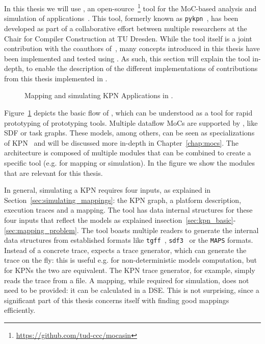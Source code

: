 In this thesis we will use \mocasin, an open-source~\footnote{\url{https://github.com/tud-ccc/mocasin}} tool for the \ac{MoC}-based analysis and simulation of applications~\cite{menard_rapido21}.
This tool, formerly known as \texttt{pykpn}~\cite{menard_norcas16,goens_mcsoc18}, has been developed as part of a collaborative effort between multiple researchers at the Chair for Compiler Construction at TU Dresden.
While the tool itself is a joint contribution with the coauthors of~\cite{menard_rapido21}, many concepts introduced in this thesis have been implemented and tested using \mocasin.
As such, this section will explain the tool in-depth, to enable the description of the different implementations of contributions from this thesis implemented in \mocasin.

\begin{figure}[h]
	\centering
   \resizebox{0.95\textwidth}{!}{}
	\caption{Mapping and simulating KPN Applications in \mocasin.}
	\label{fig:mocasin_arch}
\end{figure}


Figure~\ref{fig:mocasin_arch} depicts the basic flow of \mocasin,
which can be understood as a tool for rapid prototyping of prototyping tools.
Multiple dataflow \acp{MoC} are supported by \mocasin, like \ac{SDF} or task graphs.
These models, among others, can be seen as specializations of \ac{KPN}~\cite{lee1995dataflow} and will be discussed more in-depth in Chapter~\ref{chap:mocs}.
The \mocasin architecture is composed of multiple modules that can be combined to create a specific tool (e.g. for mapping or simulation). 
In the figure we show the modules that are relevant for this thesis.

In general, simulating a KPN requires four inputs, as explained in Section~\ref{sec:simulating_mappings}: the \ac{KPN} graph, a platform description, execution traces and a mapping.
The \mocasin tool has data internal structures for these four inputs that reflect the models as explained insection~\ref{sec:kpn_basic}-\ref{sec:mapping_problem}.
The tool boasts multiple readers to generate the internal data structures from established formats like \texttt{tgff}~\cite{dick1998tgff}, \texttt{sdf3}~\cite{sdf3} or the \texttt{MAPS} formats. \index{\acs*{\SDFFF}}
Instead of a concrete trace, \mocasin expects a trace generator, which can generate the trace on the fly: this is useful e.g. for non-deterministic models computation, but for KPNs the two are equivalent.
The \ac{KPN} trace generator, for example, simply reads the trace from a file.
A mapping, while required for simulation, does not need to be provided: it can be calculated in a \acl{DSE}.
This is not surprising, since a significant part of this thesis concerns itself with finding good mappings efficiently.

